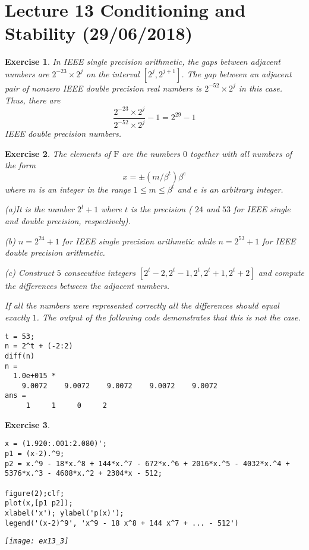 \documentclass[paper=a4, fontsize=11pt]{scrartcl} %
\numberwithin{equation}{section} %
\numberwithin{figure}{section} %
\numberwithin{table}{section} %
\newtheorem{exercise}{Exercise}
\numberwithin{exercise}{section}
\begin{document}
\clearpage

\section{Lecture 13 Conditioning and Stability (29/06/2018)}
\begin{exercise}
In IEEE single precision arithmetic, the gaps between adjacent numbers are  $2^{-23} \times 2^j$ on the interval $[2^j, 2^{j+1}]$. The gap between an adjacent pair of nonzero IEEE double precision real numbers is $2^{-52} \times 2^j$ in this case. Thus, there are 
$$ \frac{2^{-23} \times 2^j}{2^{-52} \times 2^j}-1=2^{29}-1$$
IEEE double precision numbers.
\end{exercise}
\begin{exercise}

The elements of $\mathrm{F}$ are the numbers $0$ together with all numbers of the form 
$$x=\pm (m/\beta^t)\beta^e$$
where $m$ is an integer in the range $1\leq m \leq \beta^t$ and $e$ is an arbitrary integer.

(a)It is the number $2^t + 1$ where $t$ is the precision ( $24$ and $53$ for IEEE single and double precision, respectively). 


     
(b) $n=2^24+1$ for IEEE single precision arithmetic while $n=2^53+1$ for IEEE double precision arithmetic.
     
(c) Construct $5$ consecutive integers $[2^t-2, 2^t-1, 2^t, 2^t+1, 2^t+2]$ and compute the differences between the adjacent numbers.


If all the numbers were represented correctly all the differences should equal exactly $1$. The output of the following code demonstrates that this is not the case.
  \begin{verbatim}
t = 53;
n = 2^t + (-2:2)
diff(n)
n =
  1.0e+015 *
    9.0072    9.0072    9.0072    9.0072    9.0072
ans =
     1     1     0     2
     \end{verbatim}\color{black}
     
\end{exercise}

\begin{exercise}
\begin{verbatim}
x = (1.920:.001:2.080)';
p1 = (x-2).^9;
p2 = x.^9 - 18*x.^8 + 144*x.^7 - 672*x.^6 + 2016*x.^5 - 4032*x.^4 + 5376*x.^3 - 4608*x.^2 + 2304*x - 512;

figure(2);clf;
plot(x,[p1 p2]);
xlabel('x'); ylabel('p(x)');
legend('(x-2)^9', 'x^9 - 18 x^8 + 144 x^7 + ... - 512')
     \end{verbatim}\color{black}
\texttt{[image: ex13\_3]}
\end{exercise}
\end{document}
